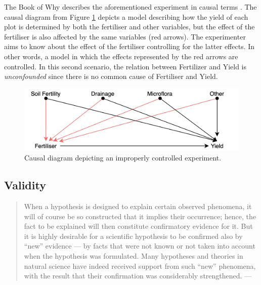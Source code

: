 \documentclass[
]{book}
\begin{document}
The Book of Why describes the aforementioned experiment in causal terms \citep{book-of-why}. The causal diagram from Figure \ref{fig:rct-diagram} depicts a model describing how the yield of each plot is determined by both the fertiliser and other variables, but the effect of the fertiliser is also affected by the same variables (red arrows). The experimenter aims to know about the effect of the fertiliser controlling for the latter effects. In other words, a model in which the effects represented by the red arrows are controlled. In this second scenario, the relation between Fertilizer and Yield is \emph{unconfounded} since there is no common cause of Fertiliser and Yield.

\begin{figure}

{\centering \includegraphics[width=1\linewidth]{Figures/RCT-causal-diagram} 

}

\caption{Causal diagram depicting an improperly controlled experiment.}\label{fig:rct-diagram}
\end{figure}

\hypertarget{validity}{%
\subsection{Validity}\label{validity}}

\begin{quote}
When a hypothesis is designed to explain certain observed phenomena, it will of course be so constructed that it implies their occurrence; hence, the fact to be explained will then constitute confirmatory evidence for it. But it is highly desirable for a scientific hypothesis to be confirmed also by ``new'' evidence --- by facts that were not known or not taken into account when the hypothesis was formulated. Many hypotheses and theories in natural science have indeed received support from such ``new'' phenomena, with the result that their confirmation was considerably strengthened. --- \citep{hempel-pos}
\end{quote}
\end{document}
